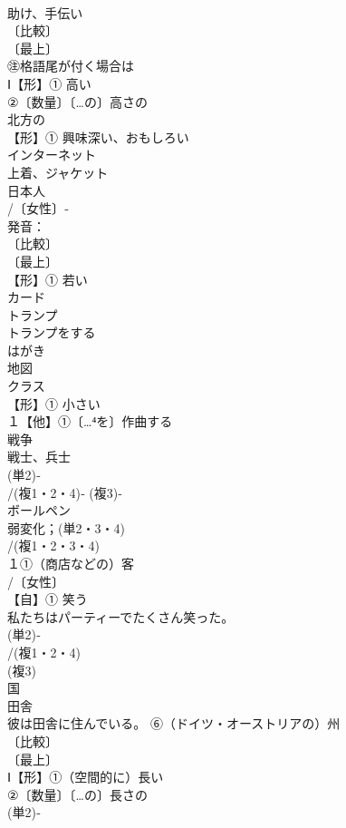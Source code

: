 \documentclass[8pt]{extreport}
\begin{document}
\begin{CJK}{UTF8}{min}
\\	助け、手伝い 
\\	〔比較〕
\\	〔最上〕
\\	㊟格語尾が付く場合は 
\\	Ⅰ【形】① 高い
\\	②〔数量〕〔…の〕高さの　
\\	北方の
\\	【形】① 興味深い、おもしろい
\\	インターネット
\\	上着、ジャケット
\\	日本人
\\	/〔女性〕‐
\\	発音：
\\	〔比較〕
\\	〔最上〕
\\	【形】① 若い 
\\	カード
\\	トランプ
\\	トランプをする 
\\	はがき　　
\\	地図 
\\	クラス 
\\	【形】① 小さい
\\	１【他】①〔…⁴を〕作曲する
\\	戦争 
\\	戦士、兵士
\\	(単2)‐
\\	/(複1・2・4)‐ (複3)‐
\\	ボールペン
\\	弱変化；(単2・3・4)
\\	/(複1・2・3・4)
\\	１①（商店などの）客 
\\	/〔女性〕
\\	【自】① 笑う 
\\	私たちはパーティーでたくさん笑った。
\\	(単2)‐
\\	/(複1・2・4)
\\	(複3)
\\	国
\\	田舎 
\\	彼は田舎に住んでいる。 ⑥（ドイツ・オーストリアの）州
\\	〔比較〕
\\	〔最上〕
\\	Ⅰ【形】①（空間的に）長い 
\\	②〔数量〕〔…の〕長さの
\\	(単2)‐

\end{CJK}
\end{document}
